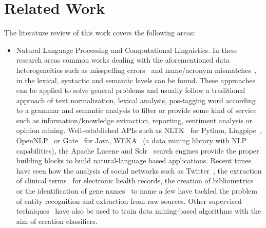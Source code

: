 \documentclass{llncs}
\begin{document}
\section{Related Work}
The literature review of this work covers the following areas:
\begin{itemize}
 \item Natural Language Processing and Computational Linguistics. In these research areas common works dealing with the aforementioned data heterogeneities 
   such as misspelling errors~\cite{NorvigSpelling,StanfordSpelling} and name/acronym mismatches~\cite{Yeates99automaticextraction,Ratinov:2004:AES:1025132.1026366}, 
  in the lexical, syntactic and semantic levels can be found. These approaches can be applied to solve general problems and usually follow a 
  traditional approach of text normalization, lexical analysis, pos-tagging word according to a grammar and semantic analysis to filter or 
  provide some kind of service such as information/knowledge extraction, reporting, sentiment analysis or opinion mining. 
  Well-established APIs such as NLTK~\cite{LoperBird02} for Python, Lingpipe~\cite{Lingpipe}, OpenNLP~\cite{OpenNLP} or Gate~\cite{Gate} for Java, WEKA~\cite{read12:_scalab} 
  (a data mining library with NLP capabilities), the Apache Lucene and Solr~\cite{rafa2011apache} search engines provide the proper building blocks to build natural-language based applications. 
  Recent times have seen how the analysis of social networks such as Twitter~\cite{Li:2012:TNE:2348283.2348380,Gimpel:2011:PTT:2002736.2002747}, the extraction of 
  clinical terms~\cite{Wang:2009:ARN:1667884.1667888} for electronic health records, the creation of bibliometrics~\cite{Galvez2006,Morillo:2013:TAA:2424697.2424727} or 
  the identification of gene names~\cite{Krauthammer:2004:TIB:1053007.1053018,Galvez2012} to name a few have tackled the problem of entity recognition and extraction from raw sources. 
  Other supervised techniques~\cite{Bohn:2006:PHD} have also be used to train data mining-based algorithms with the aim of creation classifiers.
 

\end{itemize}
\end{document}

